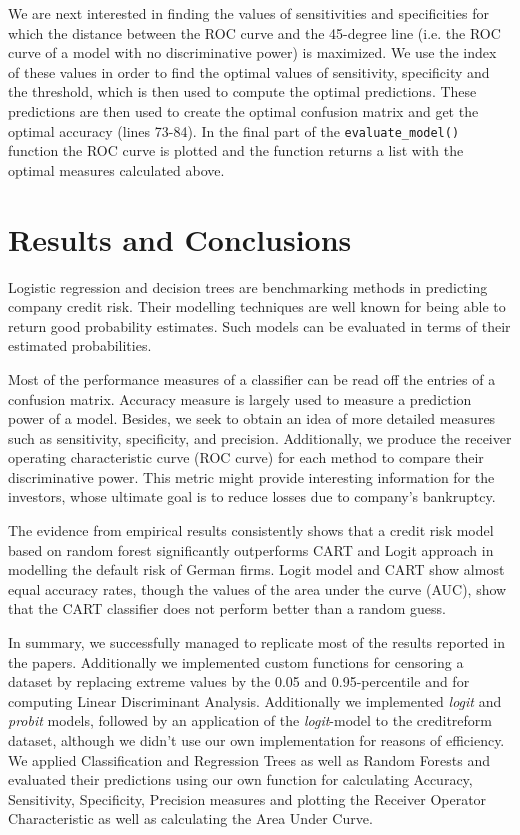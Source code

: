 \documentclass{article}
\begin{document}
We are next interested in finding the values of sensitivities and specificities for which the distance between the ROC curve and the 45-degree line (i.e. the ROC curve of a model with no discriminative power) is maximized. We use the index of these values in order to find the optimal values of sensitivity, specificity and the threshold, which is then used to compute the optimal predictions. These predictions are then used to create the optimal confusion matrix and get the optimal accuracy (lines 73-84). In the final part of the \texttt{evaluate\_model()} function the ROC curve is plotted and the function returns a list with the optimal measures calculated above.

\newpage
\section{Results and Conclusions}

Logistic regression and decision trees are benchmarking methods in predicting company credit risk. Their modelling techniques are well known for being able to return good probability estimates. Such models can be evaluated in terms of their estimated probabilities. 

Most of the performance measures of a classifier can be read off the entries of a confusion matrix. Accuracy measure is largely used to measure a prediction power of a model. Besides, we seek to obtain an idea of more detailed measures such as sensitivity, specificity, and precision. Additionally, we produce the receiver operating characteristic curve (ROC curve) for each method to compare their discriminative power. This metric might provide interesting information for the investors, whose ultimate goal is to reduce losses due to company's bankruptcy. 

The evidence from empirical results consistently shows that a credit risk model based on random forest significantly outperforms CART and Logit approach in modelling the default risk of German firms. Logit model and CART show almost equal accuracy rates, though the values of the area under the curve (AUC), show that the CART classifier does not perform better than a random guess.

In summary, we successfully managed to replicate most of the results reported in the papers. Additionally we implemented custom functions for censoring a dataset by replacing extreme values by the 0.05 and 0.95-percentile and for computing Linear Discriminant Analysis. Additionally we implemented \textit{logit} and \textit{probit} models, followed by an application of the \textit{logit}-model to the creditreform dataset, although we didn't use our own implementation for reasons of efficiency. We applied Classification and Regression Trees as well as Random Forests and evaluated their predictions using our own function for calculating Accuracy, Sensitivity, Specificity, Precision measures and plotting the Receiver Operator Characteristic as well as calculating the Area Under Curve.
\end{document}
